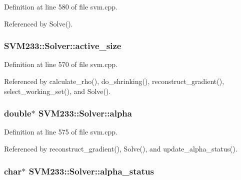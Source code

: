 Definition at line 580 of file svm.\+cpp.



Referenced by Solve().

\subsubsection[{\texorpdfstring{active\+\_\+size}{active_size}}]{ S\+V\+M233\+::\+Solver\+::active\+\_\+size\hspace{0.3cm}{\ttfamily [protected]}}\hypertarget{class_s_v_m233_1_1_solver_aaa5d0e6b5e847cf0f05d5e5a44c96d1e}{}\label{class_s_v_m233_1_1_solver_aaa5d0e6b5e847cf0f05d5e5a44c96d1e}


Definition at line 570 of file svm.\+cpp.



Referenced by calculate\+\_\+rho(), do\+\_\+shrinking(), reconstruct\+\_\+gradient(), select\+\_\+working\+\_\+set(), and Solve().

\subsubsection[{\texorpdfstring{alpha}{alpha}}]{\setlength{\rightskip}{0pt plus 5cm}double$\ast$ S\+V\+M233\+::\+Solver\+::alpha\hspace{0.3cm}{\ttfamily [protected]}}\hypertarget{class_s_v_m233_1_1_solver_ade1450d3dbc0633ad00958cf2b78eb0b}{}\label{class_s_v_m233_1_1_solver_ade1450d3dbc0633ad00958cf2b78eb0b}


Definition at line 575 of file svm.\+cpp.



Referenced by reconstruct\+\_\+gradient(), Solve(), and update\+\_\+alpha\+\_\+status().

\subsubsection[{\texorpdfstring{alpha\+\_\+status}{alpha_status}}]{\setlength{\rightskip}{0pt plus 5cm}char$\ast$ S\+V\+M233\+::\+Solver\+::alpha\+\_\+status\hspace{0.3cm}{\ttfamily [protected]}}\hypertarget{class_s_v_m233_1_1_solver_a53fe33a3d4e7904b9b26343eb3942309}{}\label{class_s_v_m233_1_1_solver_a53fe33a3d4e7904b9b26343eb3942309}


